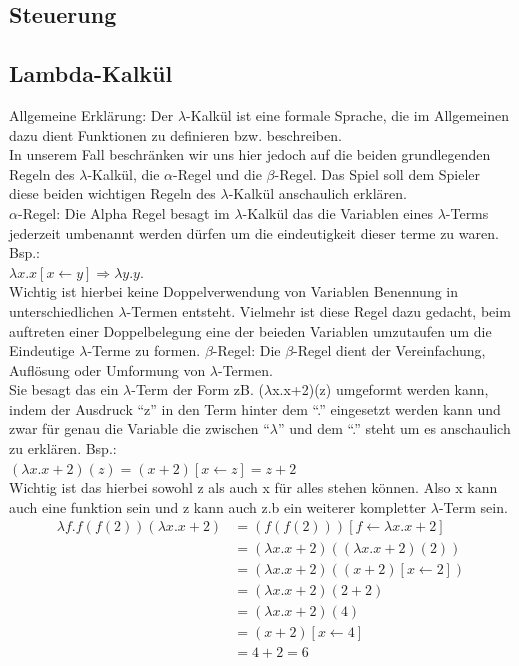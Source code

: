 \documentclass{scrartcl}
\begin{document}
\subsection{Steuerung}  \label{subsection:Steuerung}




\subsection{Lambda-Kalkül}  \label{subsection:LambdaKalkül}

\begin{description}

	\begin{minipage}{1\textwidth}
	\item[Allgemeine Erklärung:] \label{LambdaKalkül:AlgemeineErklärung} Der $\lambda$-Kalkül ist eine formale Sprache, die im Allgemeinen dazu dient Funktionen zu definieren bzw. beschreiben.\\
	In unserem Fall beschränken wir uns hier jedoch auf die beiden grundlegenden Regeln des $\lambda$-Kalkül, die $\alpha$-Regel und die $\beta$-Regel. Das Spiel soll dem Spieler diese beiden wichtigen Regeln des $\lambda$-Kalkül anschaulich erklären.\\
	$\alpha$-Regel: Die Alpha Regel besagt im $\lambda$-Kalkül das die Variablen eines $\lambda$-Terms jederzeit umbenannt werden dürfen um die eindeutigkeit dieser terme zu waren. Bsp.:\\
	$\lambda x.x [x \leftarrow y] \Rightarrow \lambda y.y.$\\
	Wichtig ist hierbei keine Doppelverwendung von Variablen Benennung in unterschiedlichen $\lambda$-Termen entsteht. Vielmehr ist diese Regel dazu gedacht, beim auftreten einer Doppelbelegung eine der beieden Variablen umzutaufen um die Eindeutige $\lambda$-Terme zu formen.
	$\beta$-Regel: Die $\beta$-Regel dient der Vereinfachung, Auflösung oder Umformung von $\lambda$-Termen.\\
	Sie besagt das ein $\lambda$-Term   der Form zB. ($\lambda$x.x+2)(z) umgeformt werden kann, indem der Ausdruck ``z'' in den Term hinter dem ``.'' eingesetzt werden kann und zwar für genau die Variable die zwischen ``$\lambda$'' und dem ``.'' steht um es anschaulich zu erklären. Bsp.:\\
	$(\lambda x.x+2)(z) = (x+2)[x \leftarrow z] = z + 2$ \\
	Wichtig ist das hierbei sowohl z als auch x für alles stehen können. Also x kann auch eine funktion sein und z kann auch z.b ein weiterer kompletter $\lambda$-Term sein.
	\[
		\begin{aligned}
			\lambda f.f(f(2))(\lambda x.x+2)&= (f(f(2)))[f \leftarrow \lambda x.x+2] \\
			&= (\lambda x.x+2)((\lambda x.x+2)(2)) \\
			&= (\lambda x.x+2)((x+2)[x \leftarrow 2]) \\
			&= (\lambda x.x+2)(2 + 2) \\
			&= (\lambda x.x+2)(4) \\
			&= (x+2)[x \leftarrow 4] \\
			&= 4 + 2 = 6
		\end{aligned}
	\]
	\end{minipage}
							

\end{description}
\end{document}
